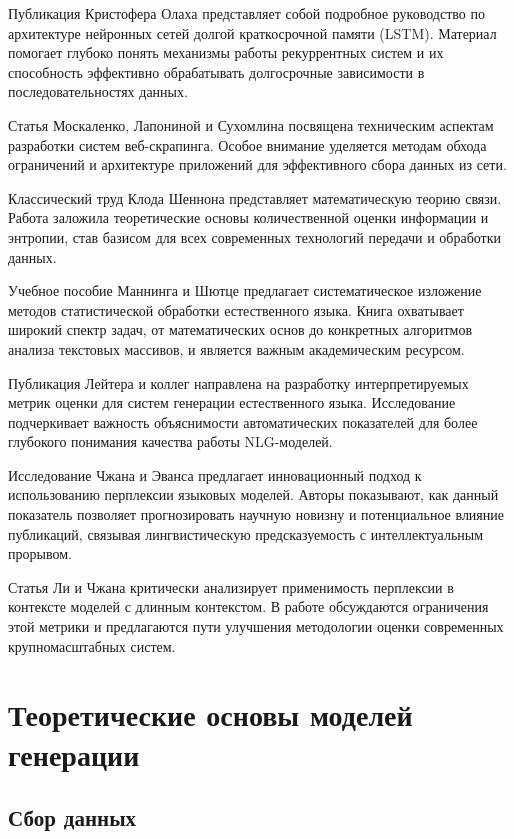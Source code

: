 \documentclass[coursework]{SCWorks}
\begin{document}
    Публикация Кристофера Олаха \cite{olah2015lstm} представляет собой подробное руководство по архитектуре нейронных сетей долгой краткосрочной памяти (LSTM). Материал помогает глубоко понять механизмы работы рекуррентных систем и их способность эффективно обрабатывать долгосрочные зависимости в последовательностях данных.

    Статья Москаленко, Лапониной и Сухомлина \cite{moskalenko} посвящена техническим аспектам разработки систем веб-скрапинга. Особое внимание уделяется методам обхода ограничений и архитектуре приложений для эффективного сбора данных из сети.

    Классический труд Клода Шеннона \cite{shannon1948} представляет математическую теорию связи. Работа заложила теоретические основы количественной оценки информации и энтропии, став базисом для всех современных технологий передачи и обработки данных.

    Учебное пособие Маннинга и Шютце \cite{manning1999} предлагает систематическое изложение методов статистической обработки естественного языка. Книга охватывает широкий спектр задач, от математических основ до конкретных алгоритмов анализа текстовых массивов, и является важным академическим ресурсом.


    Публикация Лейтера и коллег \cite{teemnlg} направлена на разработку интерпретируемых метрик оценки для систем генерации естественного языка. Исследование подчеркивает важность объяснимости автоматических показателей для более глубокого понимания качества работы NLG-моделей.

    Исследование Чжана и Эванса \cite{zhang2025language_model_perplexity} предлагает инновационный подход к использованию перплексии языковых моделей. Авторы показывают, как данный показатель позволяет прогнозировать научную новизну и потенциальное влияние публикаций, связывая лингвистическую предсказуемость с интеллектуальным прорывом.

    Статья Ли и Чжана \cite{li2024_what_wrong_with_perplexity} критически анализирует применимость перплексии в контексте моделей с длинным контекстом. В работе обсуждаются ограничения этой метрики и предлагаются пути улучшения методологии оценки современных крупномасштабных систем.


    \section{Теоретические основы моделей генерации}

    \subsection{Сбор данных}
\end{document}
